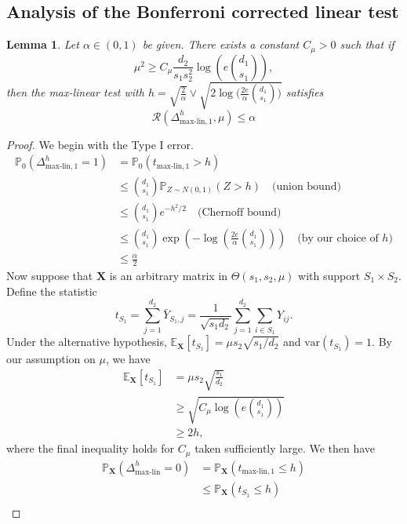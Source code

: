 \documentclass{article}
\newcommand{\X}{\mathbf{X}}
\newcommand{\bbP}{\mathbb{P}}
\newcommand{\cR}{\mathcal{R}}
\newcommand{\EE}{\mathbb{E}}
\newcommand{\linmax}{\text{max-lin}}
\newtheorem{lemma}{Lemma}
\theoremstyle{remark}
\begin{document}
\subsection{Analysis of the Bonferroni corrected linear test}

\begin{lemma}\label{lem_maxlinear_test}
Let $\alpha \in (0,1)$ be given. There exists a constant $C_\mu > 0$ such that if
    \[\mu^2 \geq C_\mu \frac{d_2}{s_1s_2^2}\log\left(e {d_1 \choose s_1}\right),\]
    then the max-linear test with $h = \sqrt{\frac{2}{\alpha}} \vee \sqrt{2\log\Big(\frac{2e}{\alpha}{d_1 \choose s_1}\Big)}$ satisfies
    \[\cR(\Delta_{\linmax, 1}^h, \mu) \leq \alpha\]
\end{lemma}
\begin{proof}
    We begin with the Type I error.
    \begin{align*}
    \bbP_0(\Delta_{\linmax, 1}^h = 1) &= \bbP_0(t_{\linmax, 1} > h) \\
        &\leq {d_1 \choose s_1}\bbP_{Z \sim N(0,1)}(Z > h)\quad \text{(union bound)} \\
        &\leq {d_1 \choose s_1} e^{-h^2/2} \quad \text{(Chernoff bound)} \\
        &\leq {d_1 \choose s_1}\exp\left(-\log\left(\frac{2e}{\alpha}{d_1 \choose s_1}\right)\right) \quad \text{(by our choice of $h$)} \\
        &\leq \frac{\alpha}{2}
    \end{align*}
    Now suppose that $\X$ is an arbitrary matrix in $\Theta(s_1, s_2, \mu)$ with support $S_1 \times S_2$. Define the statistic
    \[t_{S_1} = \sum_{j = 1}^{d_2}\bar{Y}_{S_1, j} = \frac{1}{\sqrt{s_1d_2}}\sum_{j = 1}^{d_2}\sum_{i \in  S_1}Y_{ij}.\]
    Under the alternative hypothesis, $\EE_{\X} [t_{S_1}] = \mu s_2\sqrt{s_1 / d_2}$ and $\text{var}(t_{S_1}) = 1$. By our assumption on $\mu$, we have
    \begin{align*}
        \EE_{\X} [t_{S_1}] &= \mu s_2\sqrt{\frac{s_1}{d_2}} \\
        &\geq \sqrt{C_{\mu}\log\left(e {d_1 \choose s_1}\right)} \\
        &\geq 2h,
    \end{align*}
    where the final inequality holds for $C_\mu$ taken sufficiently large. We then have
    \begin{align*}
        \bbP_{\X}(\Delta_{\linmax}^h = 0)
        &= \bbP_{\X}(t_{\linmax, 1} \leq h) \\
        &\leq \bbP_\X(t_{S_1} \leq h) \\

\end{align*}
\end{proof}
\end{document}
